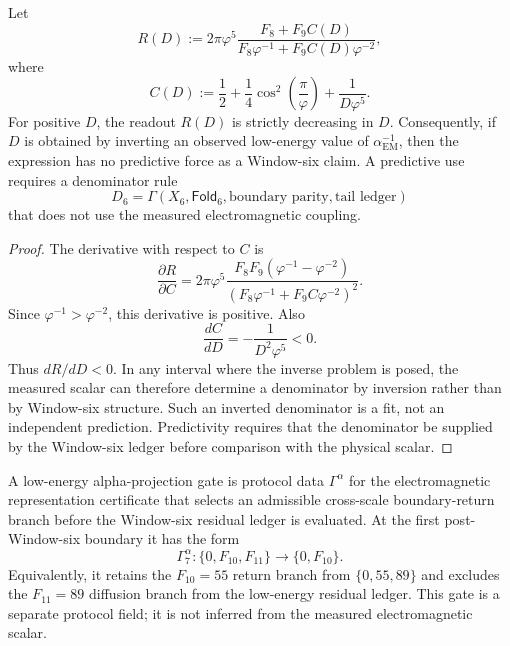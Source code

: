 \begin{theorem}
\label{thm:zeckendorf-denominator-predictivity-requirement}
Let
$$
  R(D)
  :=
  2\pi\varphi^5
  \frac{
    F_8+F_9C(D)
  }{
    F_8\varphi^{-1}+F_9C(D)\varphi^{-2}
  },
$$
where
$$
  C(D)
  :=
  \frac12
  +
  \frac14\cos^2\left(\frac{\pi}{\varphi}\right)
  +
  \frac{1}{D\varphi^5}.
$$
For positive \(D\), the readout \(R(D)\) is strictly decreasing in
\(D\). Consequently, if \(D\) is obtained by inverting an observed
low-energy value of \(\alpha_{\mathrm{EM}}^{-1}\), then the expression
has no predictive force as a Window-six claim. A predictive use requires
a denominator rule
$$
  D_6=\Gamma(X_6,\mathsf{Fold}_6,\text{boundary parity},
  \text{tail ledger})
$$
that does not use the measured electromagnetic coupling.
\end{theorem}
\begin{proof}
The derivative with respect to \(C\) is
$$
  \frac{\partial R}{\partial C}
  =
  2\pi\varphi^5
  \frac{
    F_8F_9(\varphi^{-1}-\varphi^{-2})
  }{
    (F_8\varphi^{-1}+F_9C\varphi^{-2})^2
  }.
$$
Since \(\varphi^{-1}>\varphi^{-2}\), this derivative is positive. Also
$$
  \frac{dC}{dD}
  =
  -\frac{1}{D^2\varphi^5}
  <
  0.
$$
Thus \(dR/dD<0\). In any interval where the inverse problem is posed,
the measured scalar can therefore determine a denominator by inversion
rather than by Window-six structure. Such an inverted denominator is a
fit, not an independent prediction. Predictivity requires that the
denominator be supplied by the Window-six ledger before comparison with
the physical scalar.
\end{proof}

\begin{definition}
\label{def:zeckendorf-low-energy-alpha-projection-gate}
A low-energy alpha-projection gate is protocol data
\(\Gamma^\alpha\) for the electromagnetic representation certificate that
selects an admissible cross-scale boundary-return branch before the
Window-six residual ledger is evaluated. At the first post-Window-six
boundary it has the form
$$
  \Gamma^\alpha_7:
  \{0,F_{10},F_{11}\}
  \longrightarrow
  \{0,F_{10}\}.
$$
Equivalently, it retains the \(F_{10}=55\) return branch from
\(\{0,55,89\}\) and excludes the \(F_{11}=89\) diffusion branch from the
low-energy residual ledger. This gate is a separate protocol field; it is
not inferred from the measured electromagnetic scalar.
\end{definition}

